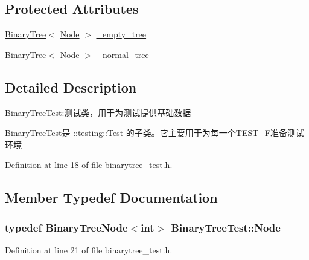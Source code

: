 \subsection*{Protected Attributes}
\begin{DoxyCompactItemize}
\item 
\hyperlink{struct_introduction_to_algorithm_1_1_tree_algorithm_1_1_binary_tree}{Binary\+Tree}$<$ \hyperlink{class_binary_tree_test_ad4aa3d3d01bf0b1b820fffa58e81e15b}{Node} $>$ \hyperlink{class_binary_tree_test_a66e48418e5449b663b2608f4914100d5}{\+\_\+empty\+\_\+tree}
\item 
\hyperlink{struct_introduction_to_algorithm_1_1_tree_algorithm_1_1_binary_tree}{Binary\+Tree}$<$ \hyperlink{class_binary_tree_test_ad4aa3d3d01bf0b1b820fffa58e81e15b}{Node} $>$ \hyperlink{class_binary_tree_test_a36a98db1094f92c94b7d7893c8975f57}{\+\_\+normal\+\_\+tree}
\end{DoxyCompactItemize}


\subsection{Detailed Description}
\hyperlink{class_binary_tree_test}{Binary\+Tree\+Test}\+:测试类，用于为测试提供基础数据 

{\ttfamily \hyperlink{class_binary_tree_test}{Binary\+Tree\+Test}}是 {\ttfamily \+::testing\+::\+Test} 的子类。它主要用于为每一个{\ttfamily T\+E\+S\+T\+\_\+\+F}准备测试环境 

Definition at line 18 of file binarytree\+\_\+test.\+h.



\subsection{Member Typedef Documentation}
\hypertarget{class_binary_tree_test_ad4aa3d3d01bf0b1b820fffa58e81e15b}{}
\subsubsection[{Node}]{\setlength{\rightskip}{0pt plus 5cm}typedef {\bf Binary\+Tree\+Node}$<$int$>$ {\bf Binary\+Tree\+Test\+::\+Node}}\label{class_binary_tree_test_ad4aa3d3d01bf0b1b820fffa58e81e15b}


Definition at line 21 of file binarytree\+\_\+test.\+h.



